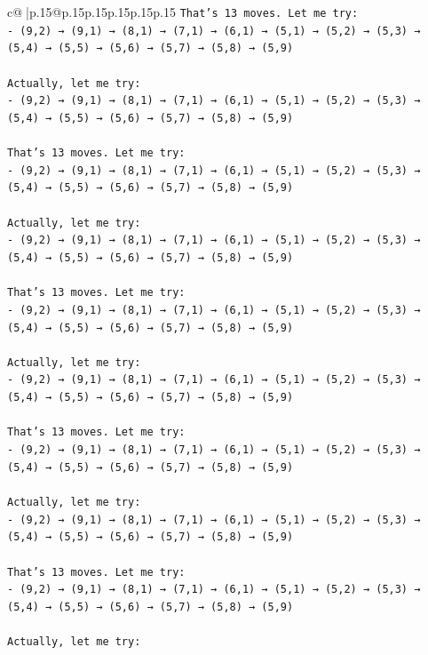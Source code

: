 \documentclass{article}
\begin{document}
{\begin{supertabular}{c@{$\;$}|p{.15\linewidth}@{}p{.15\linewidth}p{.15\linewidth}p{.15\linewidth}p{.15\linewidth}p{.15\linewidth}}
{{{\texttt{That's 13 moves. Let me try:} \\
\texttt{{-} (9,2) → (9,1) → (8,1) → (7,1) → (6,1) → (5,1) → (5,2) → (5,3) → (5,4) → (5,5) → (5,6) → (5,7) → (5,8) → (5,9)} \\
\\ 
\texttt{Actually, let me try:} \\
\texttt{{-} (9,2) → (9,1) → (8,1) → (7,1) → (6,1) → (5,1) → (5,2) → (5,3) → (5,4) → (5,5) → (5,6) → (5,7) → (5,8) → (5,9)} \\
\\ 
\texttt{That's 13 moves. Let me try:} \\
\texttt{{-} (9,2) → (9,1) → (8,1) → (7,1) → (6,1) → (5,1) → (5,2) → (5,3) → (5,4) → (5,5) → (5,6) → (5,7) → (5,8) → (5,9)} \\
\\ 
\texttt{Actually, let me try:} \\
\texttt{{-} (9,2) → (9,1) → (8,1) → (7,1) → (6,1) → (5,1) → (5,2) → (5,3) → (5,4) → (5,5) → (5,6) → (5,7) → (5,8) → (5,9)} \\
\\ 
\texttt{That's 13 moves. Let me try:} \\
\texttt{{-} (9,2) → (9,1) → (8,1) → (7,1) → (6,1) → (5,1) → (5,2) → (5,3) → (5,4) → (5,5) → (5,6) → (5,7) → (5,8) → (5,9)} \\
\\ 
\texttt{Actually, let me try:} \\
\texttt{{-} (9,2) → (9,1) → (8,1) → (7,1) → (6,1) → (5,1) → (5,2) → (5,3) → (5,4) → (5,5) → (5,6) → (5,7) → (5,8) → (5,9)} \\
\\ 
\texttt{That's 13 moves. Let me try:} \\
\texttt{{-} (9,2) → (9,1) → (8,1) → (7,1) → (6,1) → (5,1) → (5,2) → (5,3) → (5,4) → (5,5) → (5,6) → (5,7) → (5,8) → (5,9)} \\
\\ 
\texttt{Actually, let me try:} \\
\texttt{{-} (9,2) → (9,1) → (8,1) → (7,1) → (6,1) → (5,1) → (5,2) → (5,3) → (5,4) → (5,5) → (5,6) → (5,7) → (5,8) → (5,9)} \\
\\ 
\texttt{That's 13 moves. Let me try:} \\
\texttt{{-} (9,2) → (9,1) → (8,1) → (7,1) → (6,1) → (5,1) → (5,2) → (5,3) → (5,4) → (5,5) → (5,6) → (5,7) → (5,8) → (5,9)} \\
\\ 
\texttt{Actually, let me try:} \\
}}}
\end{supertabular}}
\end{document}
